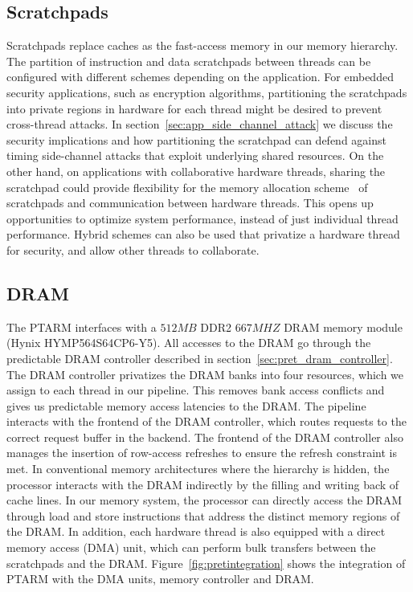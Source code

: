 \subsection{Scratchpads}
Scratchpads replace caches as the fast-access memory in our memory hierarchy.   
The partition of instruction and data scratchpads between threads can be configured with different schemes depending on the application.   
For embedded security applications, such as encryption algorithms, partitioning the scratchpads into private regions in hardware for each thread might be desired to prevent cross-thread attacks.
In section~\ref{sec:app_side_channel_attack} we discuss the security implications and how partitioning the scratchpad can defend against timing side-channel attacks that exploit underlying shared resources.
On the other hand, on applications with collaborative hardware threads, sharing the scratchpad could provide flexibility for the memory allocation scheme~\cite{Suhendra:2010:SAC:1734206.1734210} of scratchpads and communication between hardware threads.
This opens up opportunities to optimize system performance, instead of just individual thread performance.  
Hybrid schemes can also be used that privatize a hardware thread for security, and allow other threads to collaborate.  

\subsection{DRAM}
\label{sec:ptarm_dram_integration}
The PTARM interfaces with a $512MB$ DDR2 $667MHZ$ DRAM memory module (Hynix HYMP564S64CP6-Y5). 
All accesses to the DRAM go through the predictable DRAM controller described in section~\ref{sec:pret_dram_controller}.
The DRAM controller privatizes the DRAM banks into four resources, which we assign to each thread in our pipeline. 
This removes bank access conflicts and gives us predictable memory access latencies to the DRAM.
The pipeline interacts with the frontend of the DRAM controller, which routes requests to the correct request buffer in the backend.
The frontend of the DRAM controller also manages the insertion of row-access refreshes to ensure the refresh constraint is met.   
In conventional memory architectures where the hierarchy is hidden, the processor interacts with the DRAM indirectly by the filling and writing back of cache lines.
In our memory system, the processor can directly access the DRAM through load and store instructions that address the distinct memory regions of the DRAM.
In addition, each hardware thread is also equipped with a direct memory access (DMA) unit, which can perform bulk transfers between the scratchpads and the DRAM.
Figure~\ref{fig:pretintegration} shows the integration of PTARM with the DMA units, memory controller and DRAM.  

